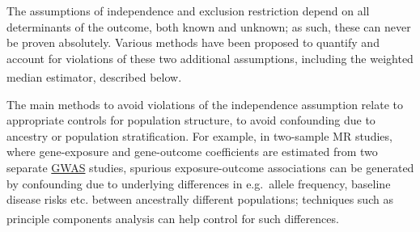 \documentclass[
]{article}
\begin{document}
The assumptions of independence and exclusion restriction depend on all determinants of the outcome, both known and unknown; as such, these can never be proven absolutely. Various methods have been proposed to quantify and account for violations of these two additional assumptions, including the weighted median estimator, described below\textsuperscript{}.

The main methods to avoid violations of the independence assumption relate to appropriate controls for population structure, to avoid confounding due to ancestry or population stratification. For example, in two-sample MR studies, where gene-exposure and gene-outcome coefficients are estimated from two separate \hyperref[acronyms_GWAS]{GWAS} studies, spurious exposure-outcome associations can be generated by confounding due to underlying differences in e.g.~allele frequency, baseline disease risks etc. between ancestrally different populations; techniques such as principle components analysis can help control for such differences\textsuperscript{}.
\end{document}
